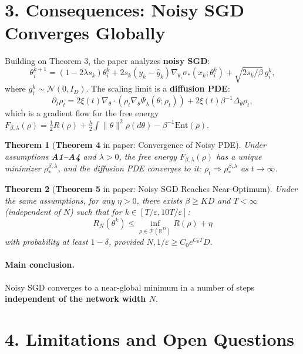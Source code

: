 \documentclass[11pt]{article}
\newcommand{\R}{\mathbb{R}}
\newtheorem{theorem}{Theorem}
\begin{document}
\section*{3. Consequences: Noisy SGD Converges Globally}

Building on Theorem 3, the paper analyzes \textbf{noisy SGD}:
\begin{equation}
\theta_i^{k+1} = (1 - 2\lambda s_k) \theta_i^k + 2s_k (y_k - \hat{y}_k) \nabla_{\theta_i} \sigma_*(x_k; \theta_i^k) + \sqrt{2s_k / \beta} \, g_i^k,
\end{equation}
where $g_i^k \sim \mathcal{N}(0, I_D)$. The scaling limit is a \textbf{diffusion PDE}:
\begin{equation}
\partial_t \rho_t = 2\xi(t) \nabla_\theta \cdot (\rho_t \nabla_\theta \Psi_\lambda(\theta; \rho_t)) + 2\xi(t) \beta^{-1} \Delta_\theta \rho_t,
\end{equation}
which is a gradient flow for the free energy $F_{\beta,\lambda}(\rho) = \frac{1}{2}R(\rho) + \frac{\lambda}{2}\int \|\theta\|^2 \rho(d\theta) - \beta^{-1} \text{Ent}(\rho)$.

\begin{theorem}[\textbf{Theorem 4} in paper: Convergence of Noisy PDE]
Under assumptions \textbf{A1--A4} and $\lambda > 0$, the free energy $F_{\beta,\lambda}(\rho)$ has a unique minimizer $\rho_*^{\beta,\lambda}$, and the diffusion PDE converges to it: $\rho_t \Rightarrow \rho_*^{\beta,\lambda}$ as $t \to \infty$.
\end{theorem}

\begin{theorem}[\textbf{Theorem 5} in paper: Noisy SGD Reaches Near-Optimum]
Under the same assumptions, for any $\eta > 0$, there exists $\beta \geq KD$ and $T < \infty$ (independent of $N$) such that for $k \in [T/\varepsilon, 10T/\varepsilon]$:
\begin{equation}
R_N(\theta^k) \leq \inf_{\rho \in \mathcal{P}(\R^D)} R(\rho) + \eta
\end{equation}
with probability at least $1 - \delta$, provided $N, 1/\varepsilon \geq C_0 e^{C_0 T} D$.
\end{theorem}

\paragraph{Main conclusion.} Noisy SGD converges to a near-global minimum in a number of steps \textbf{independent of the network width $N$}.

\section*{4. Limitations and Open Questions}
\end{document}
